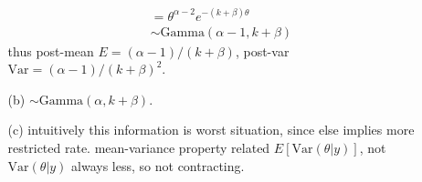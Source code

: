 \documentclass[paper=a4, fontsize=11pt]{scrartcl} %
\numberwithin{equation}{section} %
\numberwithin{figure}{section} %
\numberwithin{table}{section} %
\def \var {\text{Var}}
\begin{document}
\begin{itemize}
\begin{itemize}
\begin{align}
				&= \theta^{\alpha-2} e^{-(k+\beta)\theta}\\
				&\sim \text{Gamma}(\alpha-1, k+\beta)
		\end{align}
		thus post-mean $E= (\alpha-1)/(k+\beta)$, post-var $\var = (\alpha-1)/(k+\beta)^2$.
		\item[(b)] $\sim \text{Gamma}(\alpha, k+\beta)$.
		\item[(c)] intuitively this information is worst situation, since else implies more restricted rate. mean-variance property related $E[\var(\theta|y)]$, not $\var(\theta|y)$ always less, so not contracting.
	\end{itemize}
\end{itemize}
\end{document}
